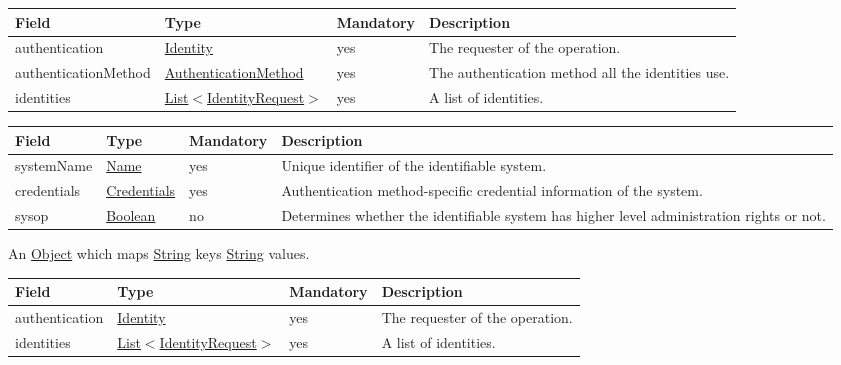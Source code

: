 \documentclass[a4paper]{arrowhead}
\newcommand{\pref}[1]{{\textcolor{ArrowheadGrey}{\hyperref[sec:model:primitives:#1]{#1}}}}
\begin{document}
\begin{table}[ht!]
\begin{tabularx}{\textwidth}{| p{3.3cm} | p{3.4cm} | p{2cm} | X |} \hline
\rowcolor{gray!33} Field & Type & Mandatory & Description \\ \hline
authentication & \hyperref[sec:model:Identity]{Identity} & yes & The requester of the operation. \\ \hline
authenticationMethod & \pref{AuthenticationMethod} & yes & The authentication method all the identities use. \\ \hline
identities & \pref{List}$<$\hyperref[sec:model:IdentityRequest]{IdentityRequest}$>$ & yes & A list of identities. \\ \hline
\end{tabularx}
\end{table}

\clearpage

 
\begin{table}[ht!]
\begin{tabularx}{\textwidth}{| p{2.5cm} | p{2.5cm} | p{2cm} | X |} \hline
\rowcolor{gray!33} Field & Type & Mandatory & Description \\ \hline
systemName & \pref{Name} & yes & Unique identifier of the identifiable system. \\ \hline
credentials &\hyperref[sec:model:Credentials]{Credentials} & yes & Authentication method-specific credential information of the system. \\ \hline
sysop & \pref{Boolean} & no & Determines whether the identifiable system has higher level administration rights or not. \\ \hline
\end{tabularx}
\end{table}


An \pref{Object} which maps \pref{String} keys \pref{String} values.

 
\begin{table}[ht!]
\begin{tabularx}{\textwidth}{| p{3.3cm} | p{3.4cm} | p{2cm} | X |} \hline
\rowcolor{gray!33} Field & Type & Mandatory & Description \\ \hline
authentication & \hyperref[sec:model:Identity]{Identity} & yes & The requester of the operation. \\ \hline
identities & \pref{List}$<$\hyperref[sec:model:IdentityRequest]{IdentityRequest}$>$ & yes & A list of identities. \\ \hline
\end{tabularx}
\end{table}
\end{document}
